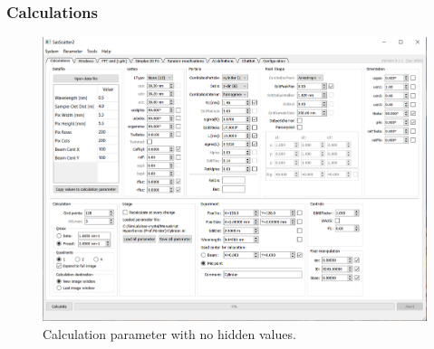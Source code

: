 \documentclass[11pt]{article} %
\begin{document}
\subsubsection{Calculations}
\begin{figure}[H]
 \centering
 \includegraphics[width=\textwidth]{gui-calculations-nohidden.png}
 \caption{Calculation parameter with no hidden values.}
\end{figure}
\end{document}
